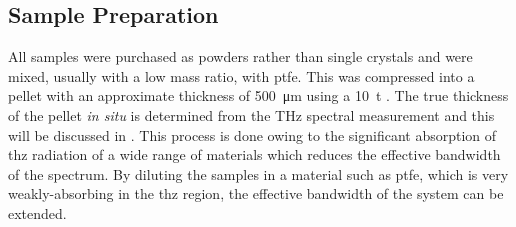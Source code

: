 \subsection{Sample Preparation}
All samples were purchased as powders rather than single crystals and were mixed, usually with a low mass ratio, with \acrfull{ptfe}. This was compressed into a pellet with an approximate thickness of \SI{500}{\micro\metre} using a \DIFdelbegin {}\DIFdelend \DIFaddbegin {}\DIFaddend \SI{10}{\tonne}\DIFdelbegin {}%
\DIFdelend . The true thickness of the pellet \textit{in situ\DIFaddbegin {}\DIFaddend } is determined from the THz spectral measurement and this will be discussed in . This process is done owing to the significant absorption of \acrshort{thz} radiation of a wide range of materials which reduces the effective bandwidth of the spectrum. By diluting the samples in a material such as \acrshort{ptfe}, which is very weakly\nobreakdash-absorbing in the \acrshort{thz} region, the effective bandwidth of the system can be extended. 

